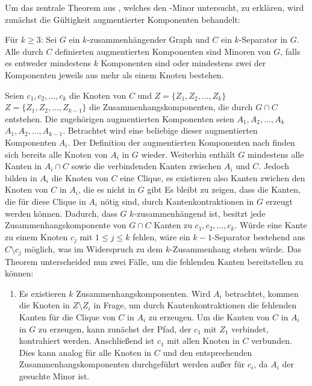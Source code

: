 Um das zentrale Theorem aus \cite{Kez92}, welches den \kdd-Minor untersucht, zu erklären, wird zunächst die Gültigkeit augmentierter Komponenten behandelt:
\begin{theorem}\label{Theorem33}
  Für $k \geq 3$: Sei $G$ ein $k$-zusammenhängender Graph und $C$ ein $k$-Separator in $G$.
  Alle durch $C$ definierten augmentierten Komponenten sind Minoren von $G$, falls es entweder mindestens $k$ Komponenten sind oder mindestens zwei der Komponenten jeweils aus mehr als einem Knoten bestehen.
\end{theorem}
\begin{beweis}
  Seien $c_1, c_2, ..., c_k$ die Knoten von $C$ und $Z = \{Z_1, Z_2, ..., Z_k\}$ \bzw $Z = \{Z_1, Z_2, ..., Z_{k-1}\}$ die Zusammenhangskomponenten, die durch $G \cap C$ entstehen.
  Die zugehörigen augmentierten Komponenten seien $A_1, A_2, ..., A_k$ \bzw $A_1, A_2, ..., A_{k-1}$.
  Betrachtet wird eine beliebige dieser augmentierten Komponenten $A_i$.
  Der Definition der augmentierten Komponenten nach finden sich bereits alle Knoten von $A_i$ in $G$ wieder. %
  Weiterhin enthält $G$ mindestens alle Kanten in $A_i \cap C$ sowie die verbindenden Kanten zwischen $A_i$ und $C$.
  Jedoch bilden in $A_i$ die Knoten von $C$ eine Clique, es existieren also \ggf Kanten zwichen den Knoten von $C$ in $A_i$, die es nicht in $G$ gibt
  Es bleibt zu zeigen, dass die Kanten, die für diese Clique in $A_i$ nötig sind, durch Kantenkontraktionen in $G$ erzeugt werden können.
  Dadurch, dass $G$ $k$-zusammenhängend ist, besitzt jede Zusammenhangskomponente von $G \cap C$ Kanten zu $c_1, c_2, ..., c_k$.
  Würde eine Kante zu einem Knoten $c_j$ mit $1 \leq j \leq k$ fehlen, wäre ein $k-1$-Separator bestehend aus $C \setminus c_j$ möglich, was im Widerspruch zu dem $k$-Zusammenhang stehen würde.
  Das Theorem unterscheided nun zwei Fälle, um die fehlenden Kanten bereitstellen zu können:
  \begin{enumerate}
    \item Es existieren $k$ Zusammenhangskomponenten.
          Wird $A_i$ betrachtet, kommen die Knoten in $Z \setminus Z_i$ in Frage, um durch Kantenkontraktionen die fehlenden Kanten für die Clique von $C$ in $A_i$ zu erzeugen.
          Um die Kanten von $C$ in $A_i$ in $G$ zu erzeugen, kann zunächst der Pfad, der $c_1$ mit $Z_1$ verbindet, kontrahiert werden.
          Anschließend ist $c_1$ mit allen Knoten in $C$ verbunden.
          Dies kann analog für alle Knoten in $C$ und den entsprechenden Zusammenhangskomponenten durchgeführt werden außer für $c_i$, da $A_i$ der gesuchte Minor ist.

\end{enumerate}
\end{beweis}
